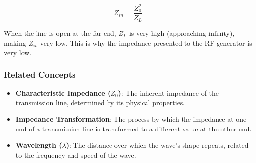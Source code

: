\[
Z_{in} = \frac{Z_0^2}{Z_L}
\]

When the line is open at the far end, \( Z_L \) is very high (approaching infinity), making \( Z_{in} \) very low. This is why the impedance presented to the RF generator is very low.

\subsubsection{Related Concepts}
\begin{itemize}
    \item \textbf{Characteristic Impedance (\( Z_0 \))}: The inherent impedance of the transmission line, determined by its physical properties.
    \item \textbf{Impedance Transformation}: The process by which the impedance at one end of a transmission line is transformed to a different value at the other end.
    \item \textbf{Wavelength (\( \lambda \))}: The distance over which the wave's shape repeats, related to the frequency and speed of the wave.
\end{itemize}

